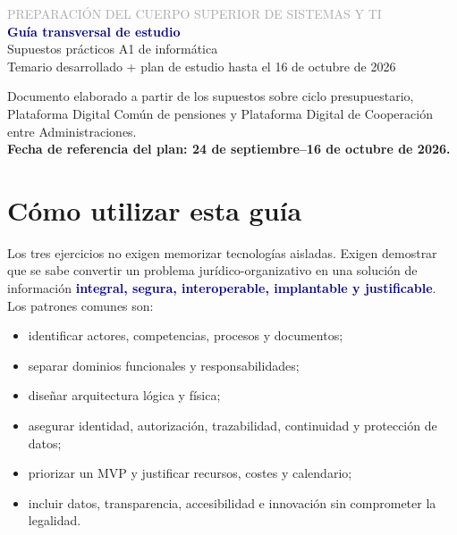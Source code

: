 \documentclass[11pt,a4paper]{article}
\newcommand{\key}[1]{\textbf{\textcolor{navy}{#1}}}
\begin{document}
\begin{titlepage}
\centering\vspace*{1.5cm}
{\Large\textcolor{darkgray}{PREPARACIÓN DEL CUERPO SUPERIOR DE SISTEMAS Y TI}}\\[1cm]
{\Huge\bfseries\textcolor{navy}{Guía transversal de estudio}}\\[0.25cm]
{\LARGE Supuestos prácticos A1 de informática}\\[1.4cm]
{\large Temario desarrollado + plan de estudio hasta el 16 de octubre de 2026}\\[2cm]
\vfill
\begin{minipage}{0.84\textwidth}\small\centering
Documento elaborado a partir de los supuestos sobre ciclo presupuestario, Plataforma Digital Común de pensiones y Plataforma Digital de Cooperación entre Administraciones.\\[3pt]
\textbf{Fecha de referencia del plan: 24 de septiembre--16 de octubre de 2026.}
\end{minipage}
\end{titlepage}

\tableofcontents\newpage

\section{Cómo utilizar esta guía}

Los tres ejercicios no exigen memorizar tecnologías aisladas. Exigen demostrar que se sabe convertir un problema jurídico-organizativo en una solución de información \key{integral, segura, interoperable, implantable y justificable}. Los patrones comunes son:
\begin{itemize}
\item identificar actores, competencias, procesos y documentos;
\item separar dominios funcionales y responsabilidades;
\item diseñar arquitectura lógica y física;
\item asegurar identidad, autorización, trazabilidad, continuidad y protección de datos;
\item priorizar un MVP y justificar recursos, costes y calendario;
\item incluir datos, transparencia, accesibilidad e innovación sin comprometer la legalidad.
\end{itemize}
\end{document}
